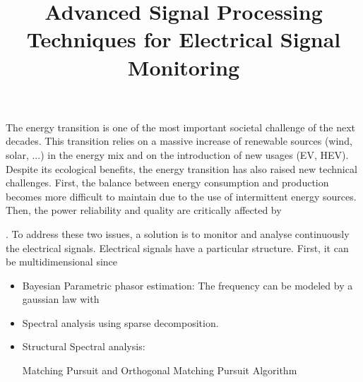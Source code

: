 \documentclass{article}
\begin{document}
\title{Advanced Signal Processing Techniques for Electrical Signal Monitoring}
   
 \maketitle  
 
The energy transition is one of the most important societal challenge of the next decades. This transition relies on a massive increase of renewable sources (wind, solar, ...) in the energy mix and on the introduction of new usages (EV, HEV). Despite its ecological benefits, the energy transition has also raised new technical challenges. First, the balance between energy consumption and production becomes more difficult to maintain due to the use of intermittent energy sources. Then, the power reliability and quality are critically affected by 


. To address these two issues, a solution is to monitor and analyse continuously the electrical signals. Electrical signals have a particular structure. First, it can be multidimensional since 


\begin{itemize}
\item Bayesian Parametric phasor estimation:
The frequency can be modeled by a gaussian law with 

\item Spectral analysis using sparse decomposition. 

\item Structural Spectral analysis: 

Matching Pursuit and Orthogonal Matching Pursuit Algorithm



\end{itemize}  
   
\end{document}
